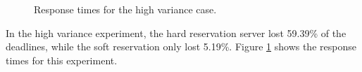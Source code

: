 \documentclass[times, 10pt,twocolumn]{article}
\begin{document}
\begin{figure}[t]
  \centering
  \caption{Response times for the high variance case.}
  \label{fig:variance}
\end{figure}


In the high variance experiment, the hard reservation server lost
59.39\% of the deadlines, while the soft reservation only lost
5.19\%. Figure \ref{fig:variance} shows the response times for this
experiment.
\end{document}
